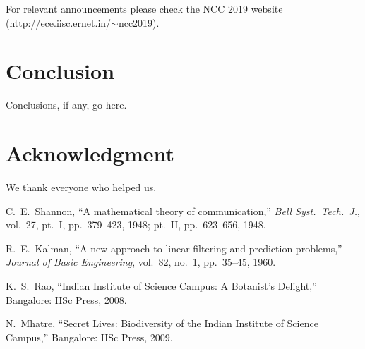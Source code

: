 \documentclass[10pt,conference]{IEEEtran}
\begin{document}
For relevant announcements please check the NCC 2019 website
(http://ece.iisc.ernet.in/$\sim$ncc2019).

\section{Conclusion}
Conclusions, if any, go here.


\section*{Acknowledgment}
We thank everyone who helped us. 

\begin{thebibliography}{1}

C.~E.~Shannon, ``A mathematical theory of communication,''
\emph{Bell Syst.\ Tech.\ J.}, vol.\ 27, pt.~I, pp.~379--423, 1948;
     pt.~II, pp.~623--656, 1948.

R.~E.~Kalman, ``A new approach to linear filtering and prediction
problems,'' \emph{Journal of Basic Engineering}, vol.\ 82, no.\ 1,
pp.~35--45, 1960.

K.~S.~Rao, ``Indian Institute of Science Campus: A Botanist's
Delight,'' Bangalore: IISc Press, 2008.

N.~Mhatre, ``Secret Lives: Biodiversity of the Indian Institute of
Science Campus,'' Bangalore: IISc Press, 2009.

\end{thebibliography}
\end{document}
